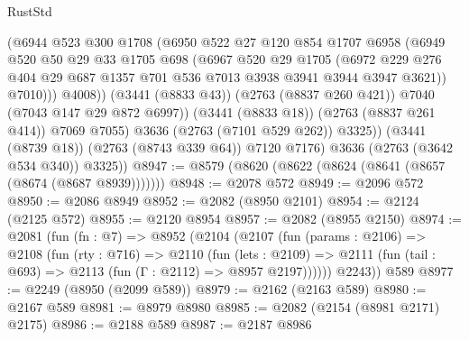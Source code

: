 \begin{lexlean}{RustStd}
\begin{coremodule}
                      (@6944
                        @523
                        @300
                        @1708
                        (@6950
                          @522
                          @27
                          @120
                          @854
                          @1707
                          @6958
                          (@6949
                            @520
                            @50
                            @29
                            @33
                            @1705
                            @698
                            (@6967
                              @520
                              @29
                              @1705
                              (@6972
                                @229
                                @276
                                @404
                                @29
                                @687
                                @1357
                                @701
                                @536
                                @7013
                                @3938
                                @3941
                                @3944
                                @3947
                                @3621))
                            @7010)))
                      @4008))
                  (@3441 (@8833 @43))
                  (@2763 (@8837 @260 @421))
                  @7040
                  (@7043 @147 @29 @872 @6997))
                (@3441 (@8833 @18))
                (@2763 (@8837 @261 @414))
                @7069
                @7055)
              @3636
              (@2763 (@7101 @529 @262))
              @3325))
          (@3441 (@8739 @18))
          (@2763 (@8743 @339 @64))
          @7120
          @7176)
        @3636
        (@2763 (@3642 @534 @340))
        @3325))
@8947 := @8579 (@8620 (@8622 (@8624 (@8641 (@8657 (@8674 (@8687 @8939)))))))
@8948 := @2078 @572
@8949 := @2096 @572
@8950 := @2086 @8949
@8952 := @2082 (@8950 @2101)
@8954 := @2124 (@2125 @572)
@8955 := @2120 @8954
@8957 := @2082 (@8955 @2150)
@8974 := @2081
    (fun (fn : @7) =>
    @8952
      (@2104
        (@2107
          (fun (params : @2106) =>
          @2108
            (fun (rty : @716) =>
            @2110
              (fun (lets : @2109) =>
              @2111 (fun (tail : @693) => @2113 (fun (Γ : @2112) => @8957 @2197))))))
        @2243))
    @589
@8977 := @2249 (@8950 (@2099 @589))
@8979 := @2162 (@2163 @589)
@8980 := @2167 @589
@8981 := @8979 @8980
@8985 := @2082 (@2154 (@8981 @2171) @2175)
@8986 := @2188 @589
@8987 := @2187 @8986

\end{coremodule}
\end{lexlean}
